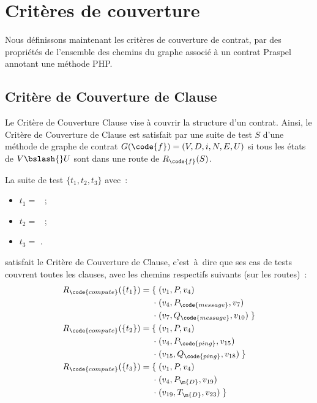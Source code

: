 \section{Critères de couverture}
\label{section:test:criteria}

Nous définissons maintenant les critères de couverture de contrat, par des
propriétés de l'ensemble des chemins du graphe associé à un contrat Praspel
annotant une méthode PHP.

\subsection{Critère de Couverture de Clause}

Le Critère de Couverture Clause vise à couvrir la structure d'un contrat. Ainsi,
le Critère de Couverture de Clause est satisfait par une suite de test $S$ d'une
méthode  de graphe de contrat $G(\code{f}) = (V, D, i, N, E, U)$ si tous
les états de $V \bslash{}U$ sont dans une route de $R_\code{f}(S)$.

\begin{example}

La suite de test $\{t_1, t_2, t_3\}$ avec~:
%
\begin{itemize}

\item
$t_1 =$ ~;

\item
$t_2 =$ ~;

\item
$t_3 =$ .

\end{itemize}
%
satisfait le Critère de Couverture de Clause, c'est~à~dire que ses cas de tests
couvrent toutes les clauses, avec les chemins respectifs suivants (sur les
routes)~:
%
\begin{align*}
%
R_\code{compute}(\{t_1\}) = \{\;
          & (v_1, P, v_4) \\
  \cdot\; & (v_4, P_\code{message}, v_7) \\
  \cdot\; & (v_7, Q_\code{message}, v_{10}) \;\} \\
%
R_\code{compute}(\{t_2\}) = \{\;
          & (v_1, P, v_4) \\
  \cdot\; & (v_4, P_\code{ping}, v_{15}) \\
  \cdot\; & (v_{15}, Q_\code{ping}, v_{18}) \;\} \\
%
R_\code{compute}(\{t_3\}) = \{\;
          & (v_1, P, v_4) \\
  \cdot\; & (v_4, P_\m{D}, v_{19}) \\
  \cdot\; & (v_{19}, T_\m{D}, v_{23}) \;\}
%
\end{align*}

\end{example}

